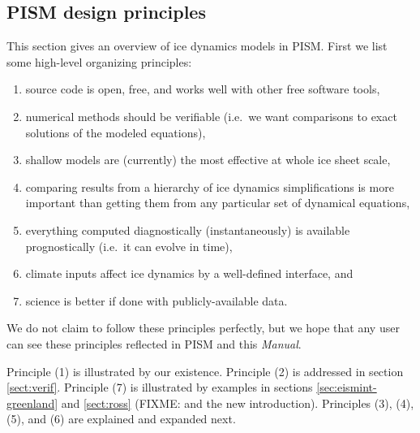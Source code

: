\documentclass[11pt,final]{amsart}
\newcommand{\ind}[1]{\index{general}{#1}}
\begin{document}
\subsection{PISM design principles}\ind{PISM!principles}  This section gives an overview of ice dynamics models in PISM.  First we list some high-level organizing principles:
\begin{enumerate}
\item source code is open, free, and works well with other free software tools,
\item numerical methods should be verifiable (i.e.~we want comparisons to exact solutions of the modeled equations),
\item shallow models are (currently) the most effective at whole ice sheet scale,
\item comparing results from a hierarchy of ice dynamics simplifications is more important than getting them from any particular set of dynamical equations,
\item everything computed diagnostically (instantaneously) is available prognostically (i.e.~it can evolve in time),
\item climate inputs affect ice dynamics by a well-defined interface, and
\item science is better if done with publicly-available data.
\end{enumerate}

\noindent We do not claim to follow these principles perfectly, but we hope that any user can see these principles reflected in PISM and this \emph{Manual}.

Principle (1) is illustrated by our existence.  Principle (2) is addressed in section \ref{sect:verif}.  Principle (7) is illustrated by examples in sections \ref{sec:eismint-greenland} and \ref{sect:ross} (FIXME: and the new introduction).  Principles (3), (4), (5), and (6) are explained and expanded next.
\end{document}
